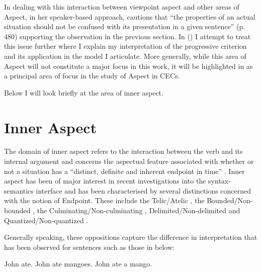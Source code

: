 In dealing with this interaction between viewpoint aspect and other areas of
Aspect, \citet{Smith1983} in her speaker-based approach, cautions that ``the
properties of an actual situation should not be confused with its presentation
in a given sentence'' (p. 480) supporting the observation in the previous
section. In  () I attempt to treat this issue
further where I explain my interpretation of the progressive criterion and its
application in the model I articulate. More generally, while this area of Aspect
will not constitute a major focus in this work, it will be highlighted in
 as a principal area of focus in the study of Aspect in CECs.

Below I will look briefly at the area of inner aspect.

\section{Inner Aspect}\label{sec:1.2}

The domain of inner aspect refers to the interaction between the verb and its
internal argument and concerns the aspectual feature associated with whether or
not a situation has a ``distinct, definite and inherent endpoint in time''
\citep[4]{Tenny1994}.  Inner aspect has been of major interest in recent
investigations into the syntax-semantics interface and has been characterised by
several distinctions concerned with the notion of Endpoint.  These include the
Telic\slash Atelic \citealt{Garey1957,Comrie1976,Smith1991, Rothstein2004},
the Bounded\slash Non-bounded \citep{Verkuyl1972,Dahl1981,Dahl1985,Jackendoff1990,Krifka1998}, 
the Culminating\slash Non-cul\-mi\-na\-ting \citep{MoensSteedman1988}, Delimited\slash Non-delimited
\citep{Mourelatos1981,Tenny1994} and Quantized\slash Non-quantized
\citep{Krifka2001, Filip2000}.

Generally speaking, these oppositions capture the difference in interpretation
that has been observed for sentences such as those in  below:

\ea\label{ex:1:6}
  \ea John ate.
  \ex John ate mangoes.
  \ex John ate a mango.
  \z
\z

